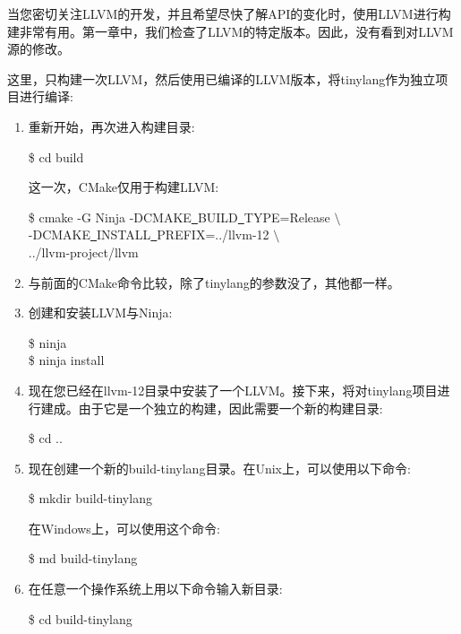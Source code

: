 当您密切关注LLVM的开发，并且希望尽快了解API的变化时，使用LLVM进行构建非常有用。第一章中，我们检查了LLVM的特定版本。因此，没有看到对LLVM源的修改。\par

这里，只构建一次LLVM，然后使用已编译的LLVM版本，将tinylang作为独立项目进行编译:\par

\begin{enumerate}
	\item 重新开始，再次进入构建目录:
	\begin{tcolorbox}[colback=white,colframe=black]
		\$ cd build
	\end{tcolorbox}
	这一次，CMake仅用于构建LLVM:
	\begin{tcolorbox}[colback=white,colframe=black]
		\$ cmake -G Ninja -DCMAKE\underline{~}BUILD\underline{~}TYPE=Release $\setminus$ \\
		-DCMAKE\underline{~}INSTALL\underline{~}PREFIX=../llvm-12 $\setminus$ \\
		../llvm-project/llvm
	\end{tcolorbox}

	\item 与前面的CMake命令比较，除了tinylang的参数没了，其他都一样。
	
	\item 创建和安装LLVM与Ninja:
	\begin{tcolorbox}[colback=white,colframe=black]
		\$ ninja \\
		\$ ninja install
	\end{tcolorbox}

	\item 现在您已经在llvm-12目录中安装了一个LLVM。接下来，将对tinylang项目进行建成。由于它是一个独立的构建，因此需要一个新的构建目录:
	\begin{tcolorbox}[colback=white,colframe=black]
		\$ cd ..
	\end{tcolorbox}
	
	\item 现在创建一个新的build-tinylang目录。在Unix上，可以使用以下命令:
	\begin{tcolorbox}[colback=white,colframe=black]
		\$ mkdir build-tinylang
	\end{tcolorbox}

	在Windows上，可以使用这个命令:
	\begin{tcolorbox}[colback=white,colframe=black]
		\$ md build-tinylang
	\end{tcolorbox}

	\item 在任意一个操作系统上用以下命令输入新目录:
	\begin{tcolorbox}[colback=white,colframe=black]
		\$ cd build-tinylang
	\end{tcolorbox}
	

\end{enumerate}
